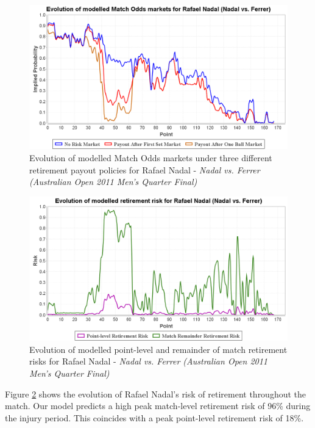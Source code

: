 \documentclass[authoryear, 12pt]{elsarticle}
\begin{document}
\begin{figure}[H]
  \centering \includegraphics[width=12.3cm]{nadalferrermodel}
  \caption{Evolution of modelled Match Odds markets under three different retirement payout policies for Rafael Nadal - \textit{Nadal vs. Ferrer (Australian Open 2011 Men's Quarter Final)}}
  \label{nadalferrermodel}
\end{figure}

\begin{figure}[H]
  \centering \includegraphics[width=12.3cm]{nadalferrerrisk}
  \caption{Evolution of modelled point-level and remainder of match retirement risks for Rafael Nadal - \textit{Nadal vs. Ferrer (Australian Open 2011 Men's Quarter Final)}}
  \label{nadalferrerrisk}
\end{figure}

Figure \ref{nadalferrerrisk} shows the evolution of Rafael Nadal's risk of retirement throughout the match.  Our model predicts a high peak match-level retirement risk of 96\% during the injury period.  This coincides with a peak point-level retirement risk of 18\%.
\end{document}
